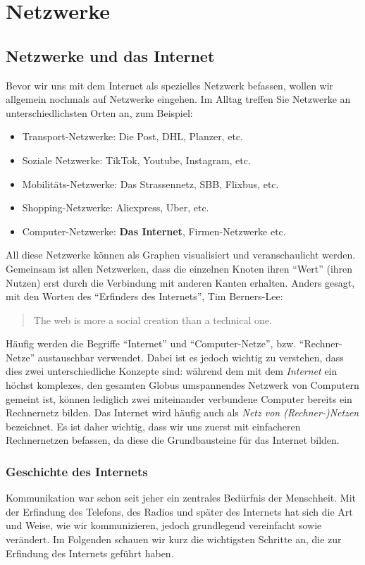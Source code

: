 \chapter{Netzwerke}

\section{Netzwerke und das Internet}
Bevor wir uns mit dem Internet als spezielles Netzwerk befassen, wollen wir allgemein nochmals auf Netzwerke eingehen. Im Alltag treffen Sie Netzwerke an unterschiedlichsten Orten an, zum Beispiel:
\begin{itemize}
	\item Transport-Netzwerke: Die Post, DHL, Planzer, etc.
	\item Soziale Netzwerke: TikTok, Youtube, Instagram, etc.
	\item Mobilitäts-Netzwerke: Das Strassennetz, SBB, Flixbus, etc.
	\item Shopping-Netzwerke: Aliexpress, Uber, etc.
	\item Computer-Netzwerke: \textbf{Das Internet}, Firmen-Netzwerke etc.
\end{itemize}

All diese Netzwerke können als Graphen visualisiert und veranschaulicht werden. Gemeinsam ist allen Netzwerken, dass die einzelnen Knoten ihren \enquote{Wert} (ihren Nutzen) erst durch die Verbindung mit anderen Kanten erhalten. Anders gesagt, mit den Worten des \enquote{Erfinders des Internets}, Tim Berners-Lee:

\begin{quotation}
	The web is more a social creation than a technical one.
\end{quotation}

Häufig werden die Begriffe ``Internet'' und ``Computer-Netze'', bzw. ``Rechner-Netze'' austauschbar verwendet. Dabei ist es jedoch wichtig zu verstehen, dass dies zwei unterschiedliche Konzepte sind: während dem mit dem \textit{Internet} ein höchst komplexes, den gesamten Globus umspannendes Netzwerk von Computern gemeint ist, können lediglich zwei miteinander verbundene Computer bereits ein Rechnernetz bilden. Das Internet wird häufig auch als \textit{Netz von (Rechner-)Netzen} bezeichnet. Es ist daher wichtig, dass wir uns zuerst mit einfacheren Rechnernetzen befassen, da diese die Grundbausteine für das Internet bilden.

\subsection{Geschichte des Internets}
Kommunikation war schon seit jeher ein zentrales Bedürfnis der Menschheit. Mit der Erfindung des Telefons, des Radios und später des Internets hat sich die Art und Weise, wie wir kommunizieren, jedoch grundlegend vereinfacht sowie verändert. Im Folgenden schauen wir kurz die wichtigsten Schritte an, die zur Erfindung des Internets geführt haben.

